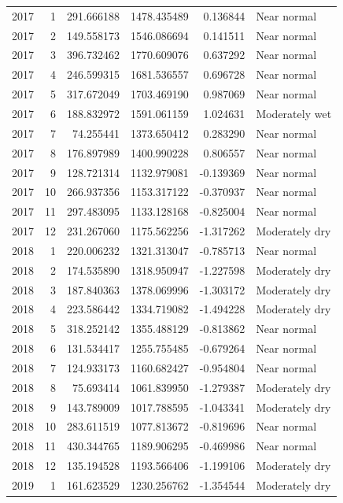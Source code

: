 \begin{tabular}{rrrrrl}
2017 & 1 & 291.666188 & 1478.435489 & 0.136844 & Near normal \\
2017 & 2 & 149.558173 & 1546.086694 & 0.141511 & Near normal \\
2017 & 3 & 396.732462 & 1770.609076 & 0.637292 & Near normal \\
2017 & 4 & 246.599315 & 1681.536557 & 0.696728 & Near normal \\
2017 & 5 & 317.672049 & 1703.469190 & 0.987069 & Near normal \\
2017 & 6 & 188.832972 & 1591.061159 & 1.024631 & Moderately wet \\
2017 & 7 & 74.255441 & 1373.650412 & 0.283290 & Near normal \\
2017 & 8 & 176.897989 & 1400.990228 & 0.806557 & Near normal \\
2017 & 9 & 128.721314 & 1132.979081 & -0.139369 & Near normal \\
2017 & 10 & 266.937356 & 1153.317122 & -0.370937 & Near normal \\
2017 & 11 & 297.483095 & 1133.128168 & -0.825004 & Near normal \\
2017 & 12 & 231.267060 & 1175.562256 & -1.317262 & Moderately dry \\
2018 & 1 & 220.006232 & 1321.313047 & -0.785713 & Near normal \\
2018 & 2 & 174.535890 & 1318.950947 & -1.227598 & Moderately dry \\
2018 & 3 & 187.840363 & 1378.069996 & -1.303172 & Moderately dry \\
2018 & 4 & 223.586442 & 1334.719082 & -1.494228 & Moderately dry \\
2018 & 5 & 318.252142 & 1355.488129 & -0.813862 & Near normal \\
2018 & 6 & 131.534417 & 1255.755485 & -0.679264 & Near normal \\
2018 & 7 & 124.933173 & 1160.682427 & -0.954804 & Near normal \\
2018 & 8 & 75.693414 & 1061.839950 & -1.279387 & Moderately dry \\
2018 & 9 & 143.789009 & 1017.788595 & -1.043341 & Moderately dry \\
2018 & 10 & 283.611519 & 1077.813672 & -0.819696 & Near normal \\
2018 & 11 & 430.344765 & 1189.906295 & -0.469986 & Near normal \\
2018 & 12 & 135.194528 & 1193.566406 & -1.199106 & Moderately dry \\
2019 & 1 & 161.623529 & 1230.256762 & -1.354544 & Moderately dry \\

\end{tabular}
